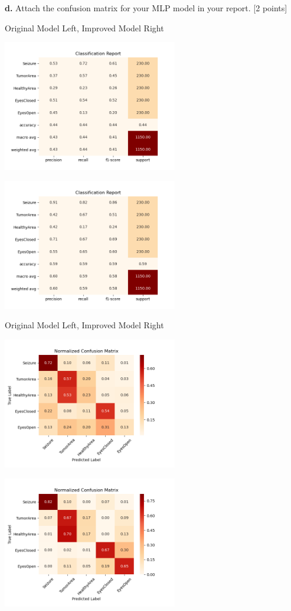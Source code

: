 \documentclass[12pt]{article}
\begin{document}
{{{{\textbf{d.} Attach the confusion matrix for your MLP model in your report. [2 points]

\bigskip

Original Model Left, Improved Model Right

\bigskip

{\includegraphics[width = 3in]{images/MLP_classification_report}
{\includegraphics[width = 3in]{images/MLP_improved_classification_report}

\bigskip

Original Model Left, Improved Model Right

\bigskip

{\includegraphics[width = 3in]{images/MLP_confusion_matrix}
{\includegraphics[width = 3in]{images/MLP_improved_confusion_matrix}

}}}}}}}}
\end{document}
